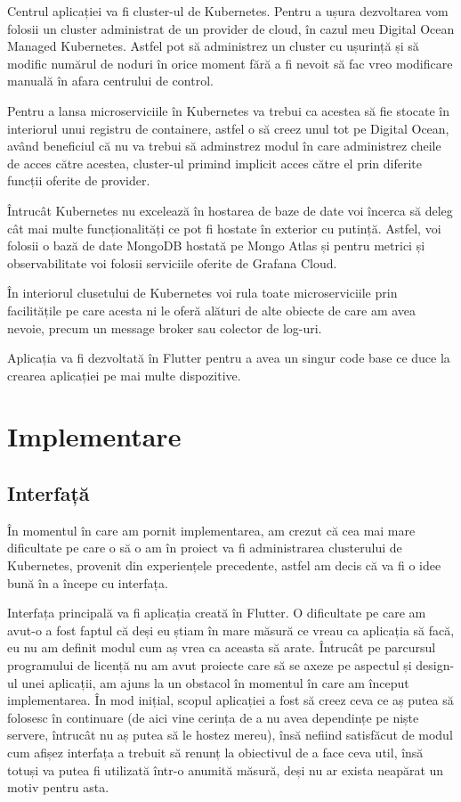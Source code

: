 Centrul aplicației va fi cluster-ul de Kubernetes. Pentru a ușura dezvoltarea vom folosii
un cluster administrat de un provider de cloud, în cazul meu Digital Ocean Managed Kubernetes.
Astfel pot să administrez un cluster cu ușurință și să modific numărul de noduri în orice moment
fără a fi nevoit să fac vreo modificare manuală în afara centrului de control.

Pentru a lansa microserviciile în Kubernetes va trebui ca acestea să fie stocate
în interiorul unui registru de containere, astfel o să creez unul tot pe Digital Ocean, având
beneficiul că nu va trebui să adminstrez modul în care administrez cheile de acces către acestea,
cluster-ul primind implicit acces către el prin diferite funcții oferite de provider.

Întrucât Kubernetes nu excelează în hostarea de baze de date voi încerca să deleg cât mai multe
funcționalități ce pot fi hostate în exterior cu putință. Astfel, voi folosii o bază de date MongoDB hostată
pe Mongo Atlas și pentru metrici și observabilitate voi folosii serviciile oferite de Grafana Cloud.

În interiorul clusetului de Kubernetes voi rula toate microserviciile prin facilitățile pe care
acesta ni le oferă alături de alte obiecte de care am avea nevoie, precum un message broker sau colector de log-uri.

Aplicația va fi dezvoltată în Flutter pentru a avea un singur code base ce duce la
crearea aplicației pe mai multe dispozitive.

\section{Implementare}

\subsection{Interfață}

În momentul în care am pornit implementarea, am crezut că cea mai mare dificultate
pe care o să o am în proiect va fi administrarea clusterului de Kubernetes, provenit din experiențele
precedente, astfel am decis că va fi o idee bună în a începe cu interfața.

Interfața principală va fi aplicația creată în Flutter. O dificultate pe care am avut-o
a fost faptul că deși eu știam în mare măsură ce vreau ca aplicația să facă, eu nu am definit
modul cum aș vrea ca aceasta să arate. Întrucât pe parcursul programului de licență nu am avut
proiecte care să se axeze pe aspectul și design-ul unei aplicații, am ajuns la un obstacol
în momentul în care am început implementarea. În mod inițial, scopul aplicației a fost să
creez ceva ce aș putea să folosesc în continuare (de aici vine cerința de a nu avea
dependințe pe niște servere, întrucât nu aș putea să le hostez mereu), însă nefiind satisfăcut
de modul cum afișez interfața a trebuit să renunț la obiectivul de a face ceva util, însă totuși
va putea fi utilizată într-o anumită măsură, deși nu ar exista neapărat un motiv pentru asta.

